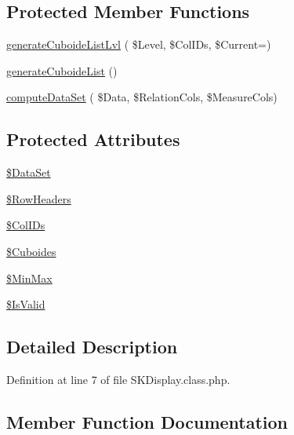 \subsection*{Protected Member Functions}
\begin{DoxyCompactItemize}
\item 
\hyperlink{class_s_k_display_a68016a979e2653d960751913fe9d656a}{generate\+Cuboide\+List\+Lvl} ( \$Level, \$Col\+I\+Ds, \$Current=\textquotesingle{}\textquotesingle{})
\item 
\hyperlink{class_s_k_display_a8eef090fc6b4a4ccf166dae15ae8f5d0}{generate\+Cuboide\+List} ()
\item 
\hyperlink{class_s_k_display_a805ee90ba419bae296d04c107a1930af}{compute\+Data\+Set} ( \$Data, \$Relation\+Cols, \$Measure\+Cols)
\end{DoxyCompactItemize}
\subsection*{Protected Attributes}
\begin{DoxyCompactItemize}
\item 
\hyperlink{class_s_k_display_a934931957c945346bbd4596de75ce618}{\$\+Data\+Set}
\item 
\hyperlink{class_s_k_display_a6c49fab244f7eec7df371f796fe86315}{\$\+Row\+Headers}
\item 
\hyperlink{class_s_k_display_ad3242c7db4f01d4e4baee918ae5a140e}{\$\+Col\+I\+Ds}
\item 
\hyperlink{class_s_k_display_a2d17506f93ec1b1e644a904ecd8fd40e}{\$\+Cuboides}
\item 
\hyperlink{class_s_k_display_add57b363ac89e9b57cf0ddc4a67287d4}{\$\+Min\+Max}
\item 
\hyperlink{class_s_k_display_a18d9132374c0c33f6445f628014d11ff}{\$\+Is\+Valid}
\end{DoxyCompactItemize}


\subsection{Detailed Description}


Definition at line 7 of file S\+K\+Display.\+class.\+php.



\subsection{Member Function Documentation}
\mbox{\label{class_s_k_display_aa138ba693f4e3d6b568e56f02dc18ea0}} 
